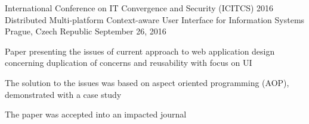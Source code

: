 \begin{cventries}
  \cventry
    {International Conference on IT Convergence and Security (ICITCS) 2016}
    {Distributed Multi-platform Context-aware User Interface for Information Systems}
    {Prague, Czech Republic}
    {September 26, 2016}
    {
      \begin{cvitems}
        \item {Paper presenting the issues of current approach to web application design concerning duplication of concerns and reusability with focus on UI}
        \item {The solution to the issues was based on aspect oriented programming (AOP), demonstrated with a case study}
        \item {The paper was accepted into an impacted journal}
      \end{cvitems}
    }
\end{cventries}
